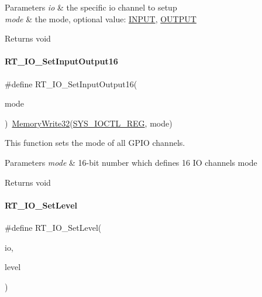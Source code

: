 \begin{DoxyParams}{Parameters}
{\em io} & the specific io channel to setup \\
\hline
{\em mode} & the mode, optional value\+: \mbox{\hyperlink{a00014_a1bb283bd7893b9855e2f23013891fc82}{I\+N\+P\+UT}}, \mbox{\hyperlink{a00014_a61a3c9a18380aafb6e430e79bf596557}{O\+U\+T\+P\+UT}} \\
\hline
\end{DoxyParams}
\begin{DoxyReturn}{Returns}
void 
\end{DoxyReturn}
\mbox{\label{a00014_ade4bc867a36445fe0debc59cd5c9d9a5}} 
\paragraph{\texorpdfstring{R\+T\+\_\+\+I\+O\+\_\+\+Set\+Input\+Output16}{RT\_IO\_SetInputOutput16}}
{\footnotesize\ttfamily \#define R\+T\+\_\+\+I\+O\+\_\+\+Set\+Input\+Output16(\begin{DoxyParamCaption}\item[{}]{mode }\end{DoxyParamCaption})~\mbox{\hyperlink{a00020_a6b9732365b12e48ddb89fe1028b975b0}{Memory\+Write32}}(\mbox{\hyperlink{a00020_a43d7770fdd59d1c008b789d8e9ae882b}{S\+Y\+S\+\_\+\+I\+O\+C\+T\+L\+\_\+\+R\+EG}}, mode)}



This function sets the mode of all G\+P\+IO channels. 


\begin{DoxyParams}{Parameters}
{\em mode} & 16-\/bit number which defines 16 IO channels\textquotesingle{} mode \\
\hline
\end{DoxyParams}
\begin{DoxyReturn}{Returns}
void 
\end{DoxyReturn}
\mbox{\label{a00014_a95fe40498ba314e1ea68aaa50335e7ef}} 
\paragraph{\texorpdfstring{R\+T\+\_\+\+I\+O\+\_\+\+Set\+Level}{RT\_IO\_SetLevel}}
{\footnotesize\ttfamily \#define R\+T\+\_\+\+I\+O\+\_\+\+Set\+Level(\begin{DoxyParamCaption}\item[{}]{io,  }\item[{}]{level }\end{DoxyParamCaption})}

